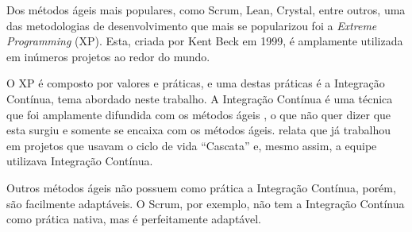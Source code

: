 Dos métodos ágeis mais populares, como Scrum, Lean, Crystal, entre outros, uma das metodologias de desenvolvimento que mais se popularizou foi a \textit{Extreme Programming} (XP). Esta, criada por Kent Beck em 1999, é amplamente utilizada em inúmeros projetos ao redor do mundo.

O XP é composto por valores e práticas, e uma destas práticas é a Integração Contínua, tema abordado neste trabalho. A Integração Contínua é uma técnica que foi amplamente difundida com os métodos ágeis \cite{DUVALL-ENTREVISTA}, o que não quer dizer que esta surgiu e somente se encaixa com os métodos ágeis.  relata que já trabalhou em projetos que usavam o ciclo de vida ``Cascata'' e, mesmo assim, a equipe utilizava Integração Contínua.

Outros métodos ágeis não possuem como prática a Integração Contínua, porém, são facilmente adaptáveis. O Scrum, por exemplo, não tem a Integração Contínua como prática nativa, mas é perfeitamente adaptável.

